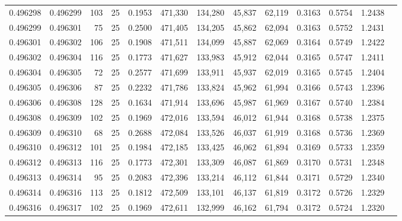 \begin{tabular}{rrrrrrrrrrrrr}
0.496298 & 0.496299 &   103 &  25 &                                     0.1953 & 471,330 & 134,280 &  45,837 &  62,119 & 0.3163 & 0.5754 & 1.2438 \\
0.496299 & 0.496301 &    75 &  25 &                                     0.2500 & 471,405 & 134,205 &  45,862 &  62,094 & 0.3163 & 0.5752 & 1.2431 \\
0.496301 & 0.496302 &   106 &  25 &                                     0.1908 & 471,511 & 134,099 &  45,887 &  62,069 & 0.3164 & 0.5749 & 1.2422 \\
0.496302 & 0.496304 &   116 &  25 &                                     0.1773 & 471,627 & 133,983 &  45,912 &  62,044 & 0.3165 & 0.5747 & 1.2411 \\
0.496304 & 0.496305 &    72 &  25 &                                     0.2577 & 471,699 & 133,911 &  45,937 &  62,019 & 0.3165 & 0.5745 & 1.2404 \\
0.496305 & 0.496306 &    87 &  25 &                                     0.2232 & 471,786 & 133,824 &  45,962 &  61,994 & 0.3166 & 0.5743 & 1.2396 \\
0.496306 & 0.496308 &   128 &  25 &                                     0.1634 & 471,914 & 133,696 &  45,987 &  61,969 & 0.3167 & 0.5740 & 1.2384 \\
0.496308 & 0.496309 &   102 &  25 &                                     0.1969 & 472,016 & 133,594 &  46,012 &  61,944 & 0.3168 & 0.5738 & 1.2375 \\
0.496309 & 0.496310 &    68 &  25 &                                     0.2688 & 472,084 & 133,526 &  46,037 &  61,919 & 0.3168 & 0.5736 & 1.2369 \\
0.496310 & 0.496312 &   101 &  25 &                                     0.1984 & 472,185 & 133,425 &  46,062 &  61,894 & 0.3169 & 0.5733 & 1.2359 \\
0.496312 & 0.496313 &   116 &  25 &                                     0.1773 & 472,301 & 133,309 &  46,087 &  61,869 & 0.3170 & 0.5731 & 1.2348 \\
0.496313 & 0.496314 &    95 &  25 &                                     0.2083 & 472,396 & 133,214 &  46,112 &  61,844 & 0.3171 & 0.5729 & 1.2340 \\
0.496314 & 0.496316 &   113 &  25 &                                     0.1812 & 472,509 & 133,101 &  46,137 &  61,819 & 0.3172 & 0.5726 & 1.2329 \\
0.496316 & 0.496317 &   102 &  25 &                                     0.1969 & 472,611 & 132,999 &  46,162 &  61,794 & 0.3172 & 0.5724 & 1.2320 \\

\end{tabular}

